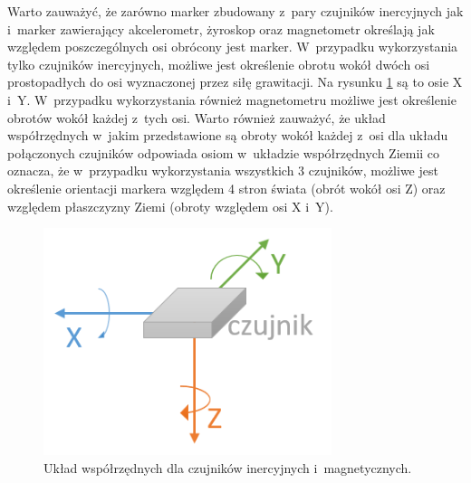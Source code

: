 Warto zauważyć, że zarówno marker zbudowany z~pary czujników inercyjnych jak i~marker zawierający akcelerometr, żyroskop oraz magnetometr określają jak względem poszczególnych osi obrócony jest marker. W~przypadku wykorzystania tylko czujników inercyjnych, możliwe jest określenie obrotu wokół dwóch osi prostopadłych do osi wyznaczonej przez siłę grawitacji. Na rysunku \ref{fig:literature:imu:coordination} są to osie X i~Y. W~przypadku wykorzystania również magnetometru możliwe jest określenie obrotów wokół każdej z~tych osi. Warto również zauważyć, że układ współrzędnych w~jakim przedstawione są obroty wokół każdej z~osi dla układu połączonych czujników odpowiada osiom w~układzie współrzędnych Ziemii co oznacza, że w~przypadku wykorzystania wszystkich 3 czujników, możliwe jest określenie orientacji markera względem 4 stron świata (obrót wokół osi Z) oraz względem płaszczyzny Ziemi (obroty względem osi X i~Y).

\begin{figure}[!htp]
	\centering	
	\includegraphics[width=0.75\textwidth]{images/IMUAxes.png}
	\caption{Układ współrzędnych dla czujników inercyjnych i~magnetycznych.}
		\label{fig:literature:imu:coordination}
\end{figure}

